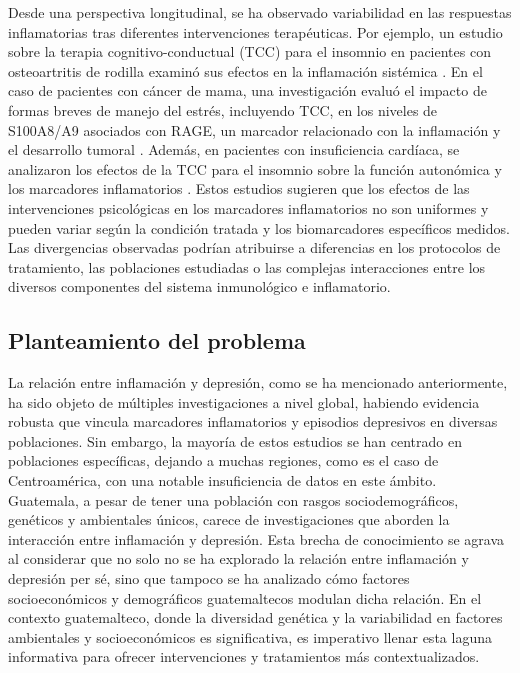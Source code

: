 \documentclass[man]{apa7}
\begin{document}
	Desde una perspectiva longitudinal, se ha observado variabilidad en las respuestas inflamatorias tras diferentes intervenciones terapéuticas. Por ejemplo, un estudio sobre la terapia cognitivo-conductual (TCC) para el insomnio en pacientes con osteoartritis de rodilla examinó sus efectos en la inflamación sistémica \parencite{munPreliminaryExaminationEffects2024}. En el caso de pacientes con cáncer de mama, una investigación evaluó el impacto de formas breves de manejo del estrés, incluyendo TCC, en los niveles de S100A8/A9 asociados con RAGE, un marcador relacionado con la inflamación y el desarrollo tumoral \parencite{taubEffectsRandomizedTrial2019}. Además, en pacientes con insuficiencia cardíaca, se analizaron los efectos de la TCC para el insomnio sobre la función autonómica y los marcadores inflamatorios \parencite{redekerEffectsCognitiveBehavioral2020}. Estos estudios sugieren que los efectos de las intervenciones psicológicas en los marcadores inflamatorios no son uniformes y pueden variar según la condición tratada y los biomarcadores específicos medidos. Las divergencias observadas podrían atribuirse a diferencias en los protocolos de tratamiento, las poblaciones estudiadas o las complejas interacciones entre los diversos componentes del sistema inmunológico e inflamatorio.

	\subsection{Planteamiento del problema}

	La relación entre inflamación y depresión, como se ha mencionado anteriormente, ha sido objeto de múltiples
	investigaciones a nivel global, habiendo evidencia robusta que vincula
	marcadores inflamatorios y episodios depresivos en diversas poblaciones.
	Sin embargo, la mayoría de estos estudios se han centrado en poblaciones
	específicas, dejando a muchas regiones, como es el caso de Centroamérica, con una
	notable insuficiencia de datos en este ámbito.\\

	Guatemala, a pesar de tener una población con rasgos sociodemográficos,
	genéticos y ambientales únicos, carece de investigaciones que aborden la
	interacción entre inflamación y depresión. Esta brecha de conocimiento
	se agrava al considerar que no solo no se ha explorado la relación entre
	inflamación y depresión per sé, sino que tampoco se ha analizado cómo
	factores socioeconómicos y demográficos guatemaltecos modulan dicha
	relación. En el contexto guatemalteco, donde la diversidad genética y la
	variabilidad en factores ambientales y socioeconómicos es significativa,
	es imperativo llenar esta laguna informativa para ofrecer intervenciones
	y tratamientos más contextualizados.
\end{document}
